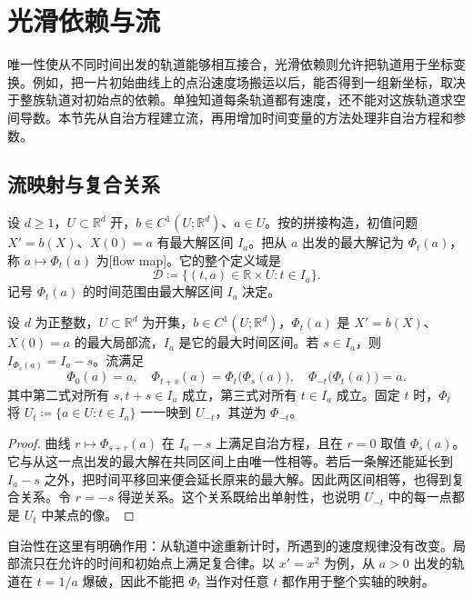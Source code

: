 \section{光滑依赖与流}
\label{b2:sec:ode-smooth-flow}

唯一性使从不同时间出发的轨道能够相互接合，光滑依赖则允许把轨道用于坐标变换。例如，把一片初始曲线上的点沿速度场搬运以后，能否得到一组新坐标，取决于整族轨道对初始点的依赖。单独知道每条轨道都有速度，还不能对这族轨道求空间导数。本节先从自治方程建立流，再用增加时间变量的方法处理非自治方程和参数。

\subsection{流映射与复合关系}
\label{b2:subsec:070202}

设 \(d\geq1\)，\(U\subset\mathbb R^d\) 开，\(b\in C^1(U;\mathbb R^d)\)、\(a\in U\)。按的拼接构造，初值问题 \(X'=b(X)\)、\(X(0)=a\) 有最大解区间 \(I_a\)。把从 \(a\) 出发的最大解记为 \(\Phi_t(a)\)，称 \(a\mapsto\Phi_t(a)\) 为[flow map]。它的整个定义域是
\[
 \mathcal D\coloneqq\{(t,a)\in\mathbb R\times U:t\in I_a\}.
\]
记号 \(\Phi_t(a)\) 的时间范围由最大解区间 \(I_a\) 决定。

\begin{proposition}\label{b2:prop:07-flow-composition}
设 \(d\) 为正整数，\(U\subset\mathbb R^d\) 为开集，\(b\in C^1(U;\mathbb R^d)\)，\(\Phi_t(a)\) 是 \(X'=b(X)\)、\(X(0)=a\) 的最大局部流，\(I_a\) 是它的最大时间区间。若 \(s\in I_a\)，则 \(I_{\Phi_s(a)}=I_a-s\)。流满足
\[
 \Phi_0(a)=a,\quad
 \Phi_{t+s}(a)=\Phi_t\bigl(\Phi_s(a)\bigr),\quad
 \Phi_{-t}\bigl(\Phi_t(a)\bigr)=a.
\]
其中第二式对所有 \(s,t+s\in I_a\) 成立，第三式对所有 \(t\in I_a\) 成立。固定 \(t\) 时，\(\Phi_t\) 将 \(U_t\coloneqq\{a\in U:t\in I_a\}\) 一一映到 \(U_{-t}\)，其逆为 \(\Phi_{-t}\)。
\end{proposition}
\begin{proof}
曲线 \(r\mapsto\Phi_{s+r}(a)\) 在 \(I_a-s\) 上满足自治方程，且在 \(r=0\) 取值 \(\Phi_s(a)\)。它与从这一点出发的最大解在共同区间上由唯一性相等。若后一条解还能延长到 \(I_a-s\) 之外，把时间平移回来便会延长原来的最大解。因此两区间相等，也得到复合关系。令 \(r=-s\) 得逆关系。这个关系既给出单射性，也说明 \(U_{-t}\) 中的每一点都是 \(U_t\) 中某点的像。
\end{proof}

自治性在这里有明确作用：从轨道中途重新计时，所遇到的速度规律没有改变。局部流只在允许的时间和初始点上满足复合律。以 \(x'=x^2\) 为例，从 \(a>0\) 出发的轨道在 \(t=1/a\) 爆破，因此不能把 \(\Phi_t\) 当作对任意 \(t\) 都作用于整个实轴的映射。

